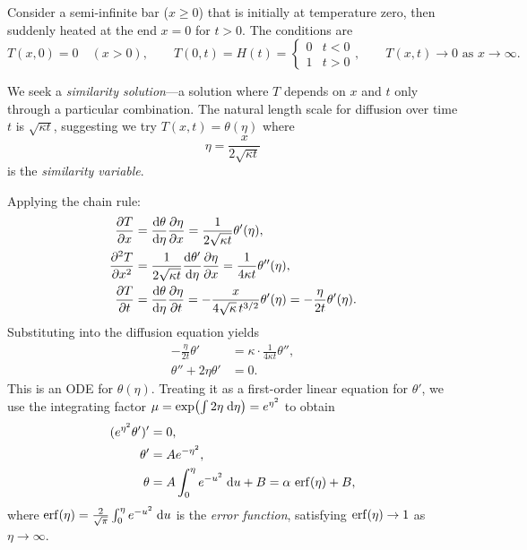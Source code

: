 \documentclass[a4paper]{article}
\begin{document}
\begin{eg}
  Consider a semi-infinite bar ($x \geq 0$) that is initially at temperature zero, then suddenly heated at the end $x = 0$ for $t > 0$. The conditions are
  \[
    T(x,0) = 0 \quad (x > 0), \qquad T(0, t) = H(t) =
    \begin{cases}
      0 & t < 0\\
      1 & t > 0
    \end{cases}, \qquad T(x, t)\to 0 \text{ as } x\to \infty.
  \]

  We seek a \emph{similarity solution}---a solution where $T$ depends on $x$ and $t$ only through a particular combination. The natural length scale for diffusion over time $t$ is $\sqrt{\kappa t}$, suggesting we try $T(x, t) = \theta(\eta)$ where
  \[
    \eta = \frac{x}{2\sqrt{\kappa t}}
  \]
  is the \emph{similarity variable}.

  Applying the chain rule:
  \begin{align*}
    \frac{\partial T}{\partial x} &= \frac{\mathrm{d} \theta}{\mathrm{d} \eta} \frac{\partial \eta}{\partial x}
    = \frac{1}{2\sqrt{\kappa t}} \theta'(\eta),\\
    \frac{\partial^2 T}{\partial x^2} &= \frac{1}{2\sqrt{\kappa t}} \frac{\mathrm{d}\theta'}{\mathrm{d}\eta}\frac{\partial \eta}{\partial x}
    = \frac{1}{4\kappa t}\theta''(\eta),\\
    \frac{\partial T}{\partial t} &= \frac{\mathrm{d} \theta}{\mathrm{d} \eta}\frac{\partial \eta}{\partial t}
    = -\frac{x}{4\sqrt{\kappa}\,t^{3/2}} \theta'(\eta)
    = -\frac{\eta}{2t}\theta'(\eta).
  \end{align*}
  Substituting into the diffusion equation yields
  \begin{align*}
    -\frac{\eta}{2t}\theta' &= \kappa \cdot \frac{1}{4\kappa t}\theta'',\\
    \theta'' + 2\eta\theta' &= 0.
  \end{align*}
  This is an ODE for $\theta(\eta)$. Treating it as a first-order linear equation for $\theta'$, we use the integrating factor $\mu = \exp\!\left(\int 2\eta \;\mathrm{d} \eta\right) = e^{\eta^2}$ to obtain
  \begin{align*}
    (e^{\eta^2}\theta')' &= 0,\\
    \theta' &= Ae^{-\eta^2},\\
    \theta &= A\int_0^\eta e^{-u^2}\;\mathrm{d} u + B
    = \alpha\,\operatorname{erf}(\eta) + B,
  \end{align*}
  where $\operatorname{erf}(\eta) = \frac{2}{\sqrt{\pi}} \int_0^\eta e^{-u^2}\;\mathrm{d} u$ is the \emph{error function}, satisfying $\operatorname{erf}(\eta)\to 1$ as $\eta\to \infty$.


\end{eg}
\end{document}
